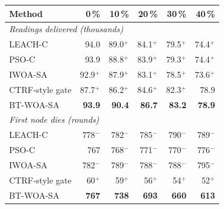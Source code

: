 \begin{tabular}{lrrrrr}
\toprule
Method & 0\,\% & 10\,\% & 20\,\% & 30\,\% & 40\,\% \\
\midrule
\multicolumn{6}{l}{\emph{Readings delivered (thousands)}} \\
LEACH-C & 94.0 & 89.0$^{+}$ & 84.1$^{+}$ & 79.5$^{+}$ & 74.4$^{+}$ \\
PSO-C & 93.9 & 88.8$^{+}$ & 83.9$^{+}$ & 79.3$^{+}$ & 74.4$^{+}$ \\
IWOA-SA & 92.9$^{+}$ & 87.9$^{+}$ & 83.1$^{+}$ & 78.5$^{+}$ & 73.6$^{+}$ \\
CTRF-style gate & 87.7$^{+}$ & 86.2$^{+}$ & 84.6$^{+}$ & 82.3$^{+}$ & 78.9 \\
BT-WOA-SA & \textbf{93.9} & \textbf{90.4} & \textbf{86.7} & \textbf{83.2} & \textbf{78.9} \\
\midrule
\multicolumn{6}{l}{\emph{First node dies (rounds)}} \\
LEACH-C & 778$^{-}$ & 782$^{-}$ & 785$^{-}$ & 790$^{-}$ & 789$^{-}$ \\
PSO-C & 767 & 768$^{-}$ & 771$^{-}$ & 770$^{-}$ & 776$^{-}$ \\
IWOA-SA & 782$^{-}$ & 789$^{-}$ & 788$^{-}$ & 788$^{-}$ & 795$^{-}$ \\
CTRF-style gate & 60$^{+}$ & 59$^{+}$ & 56$^{+}$ & 54$^{+}$ & 52$^{+}$ \\
BT-WOA-SA & \textbf{767} & \textbf{738} & \textbf{693} & \textbf{660} & \textbf{613} \\
\bottomrule
\end{tabular}
